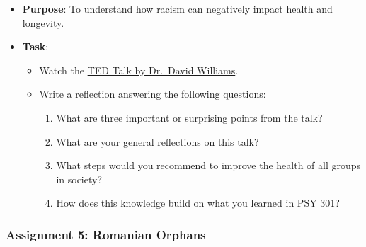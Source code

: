 \documentclass[
]{article}
\providecommand{\tightlist}{%
  \setlength{\itemsep}{0pt}\setlength{\parskip}{0pt}}
\begin{document}
\begin{itemize}
\tightlist
\item
  \textbf{Purpose}: To understand how racism can negatively impact health and longevity.\\
\item
  \textbf{Task}:

  \begin{itemize}
  \tightlist
  \item
    Watch the \href{https://www.ted.com/talks/david_r_williams_how_racism_makes_us_sick?subtitle=en}{TED Talk by Dr.~David Williams}.\\
  \item
    Write a reflection answering the following questions:

    \begin{enumerate}
    \def\labelenumi{\arabic{enumi}.}
    \tightlist
    \item
      What are three important or surprising points from the talk?\\
    \item
      What are your general reflections on this talk?\\
    \item
      What steps would you recommend to improve the health of all groups in society?\\
    \item
      How does this knowledge build on what you learned in PSY 301?
    \end{enumerate}
  \end{itemize}
\end{itemize}

\hypertarget{assignment-5-romanian-orphans}{%
\subsubsection{Assignment 5: Romanian Orphans}\label{assignment-5-romanian-orphans}}
\end{document}
